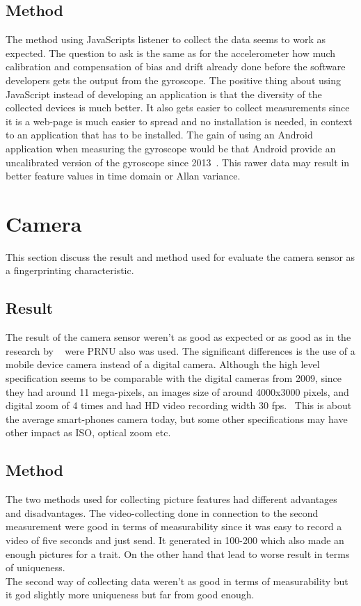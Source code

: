 \subsection{Method}
The method using JavaScripts listener to collect the data seems to work as expected. The question to ask is the same as for the accelerometer how much calibration and compensation of bias and drift already done before the software developers gets the output from the gyroscope. The positive thing about using JavaScript instead of developing an application is that the diversity of the collected devices is much better. It also gets easier to collect measurements since it is a web-page is much easier to spread and no installation is needed, in context to an application that has to be installed. The gain of using an Android application when measuring the gyroscope would be that Android provide an uncalibrated version of the gyroscope since 2013~\cite{android:API18}. This rawer data may result in better feature values in time domain or Allan variance.


\section{Camera}
This section discuss the result and method used for evaluate the camera sensor as a fingerprinting characteristic.
\subsection{Result}
The result of the camera sensor weren't as good as expected or as good as in the research by ~\cite[]{sensor:camera:DCIdent} were PRNU also was used. The significant differences is the use of a mobile device camera instead of a digital camera. Although the high level specification seems to be comparable with the digital cameras from 2009, since they had around 11 mega-pixels, an images size of around 4000x3000 pixels, and digital zoom of 4 times and had HD video recording width 30 fps.~\cite[]{gbg:kamera} This is about the average smart-phones camera today, but some other specifications may have other impact as ISO, optical zoom etc.

\subsection{Method}
The two methods used for collecting picture features had different advantages and disadvantages. The video-collecting done in connection to the second measurement were good in terms of measurability since it was easy to record a video of five seconds and just send. It generated in 100-200 which also made an enough pictures for a trait. On the other hand that lead to worse result in terms of uniqueness. \\
The second way of collecting data weren't as good in terms of measurability but it god slightly more uniqueness but far from good enough.


